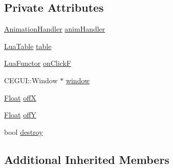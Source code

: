 \subsection*{Private Attributes}
\begin{DoxyCompactItemize}
\item 
\hyperlink{classZeta_1_1AnimationHandler}{Animation\+Handler} \hyperlink{classZeta_1_1CEGUIObject_ab0f378ea1178e0ef223464c4652e2997}{anim\+Handler}
\item 
\hyperlink{classZeta_1_1LuaTable}{Lua\+Table} \hyperlink{classZeta_1_1CEGUIObject_aea2af13d5b10dcf739073d39b3aaf206}{table}
\item 
\hyperlink{classZeta_1_1LuaFunctor}{Lua\+Functor} \hyperlink{classZeta_1_1CEGUIObject_a75308bc9e27f88d7aafc0097ceec796d}{on\+Click\+F}
\item 
C\+E\+G\+U\+I\+::\+Window $\ast$ \hyperlink{classZeta_1_1CEGUIObject_a3dcaa63869fa949e36cc765143571963}{window}
\item 
\hyperlink{namespaceZeta_a1e0a1265f9b3bd3075fb0fabd39088ba}{Float} \hyperlink{classZeta_1_1CEGUIObject_a4f94b208ed33894670d451e1b7d0033d}{off\+X}
\item 
\hyperlink{namespaceZeta_a1e0a1265f9b3bd3075fb0fabd39088ba}{Float} \hyperlink{classZeta_1_1CEGUIObject_a990bbaa17ea97bb261742b31439d9b2d}{off\+Y}
\item 
bool \hyperlink{classZeta_1_1CEGUIObject_afa1dddd4f2b7f71071cb7a4a9db79f0d}{destroy}
\end{DoxyCompactItemize}
\subsection*{Additional Inherited Members}


